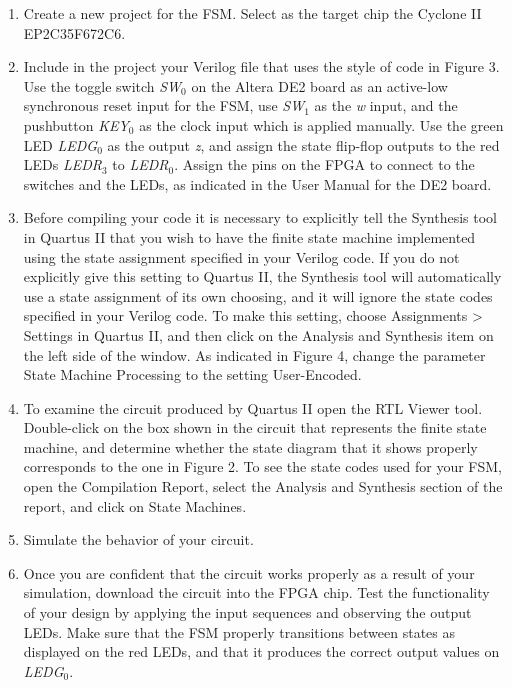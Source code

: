 \documentclass[epsfig,10pt,fullpage]{article}
\begin{document}
\begin{enumerate}
\item Create a new project for the FSM. Select as the target chip the 
Cyclone II EP2C35F672C6.

\item Include in the project your Verilog file that uses the style of code in Figure 3.
Use the toggle switch {\it SW}$_0$ on the Altera DE2 board as an active-low synchronous reset input
for the FSM, use {\it SW}$_1$ as the {\it w} input, and the pushbutton {\it KEY}$_0$ as the clock input which 
is applied manually.  Use the green LED {\it LEDG}$_0$ as the output {\it z}, 
and assign the state flip-flop outputs to the red LEDs {\it LEDR}$_3$ to {\it LEDR}$_0$.
Assign the pins on the FPGA to 
connect to the switches and the LEDs, as indicated in the User Manual for the DE2 board.

\item Before compiling your code it is necessary to explicitly tell the Synthesis tool in
Quartus II that you wish to have the finite state machine implemented using the state
assignment specified in your Verilog code. If you do not explicitly give this
setting to Quartus II, the Synthesis tool will automatically use a state assignment of
its own choosing, and it will ignore the state codes specified in your Verilog code. To
make this setting, choose {\sf Assignments > Settings} in Quartus II, and then click on the
{\sf Analysis and Synthesis} item on the left side of the window. As indicated in Figure 4,
change the parameter {\sf State Machine Processing} to the setting {\sf User-Encoded}.

\item To examine the circuit produced by Quartus II open the RTL Viewer tool. Double-click
on the box shown in the circuit that represents the finite state machine, and determine
whether the state diagram that it shows properly corresponds to the one in Figure 2.
To see the state codes used for your FSM, open the Compilation Report, select the {\sf Analysis
and Synthesis} section of the report, and click on {\sf State Machines}.

\item Simulate the behavior of your circuit.

\item Once you are confident that the circuit works properly as a result of your
simulation, download the circuit into the FPGA chip.  Test the functionality of your 
design by applying the input sequences and observing the output LEDs. Make sure that the
FSM properly transitions between states as displayed on the red LEDs, and that it produces
the correct output values on {\it LEDG}$_0$.


\end{enumerate}
\end{document}
